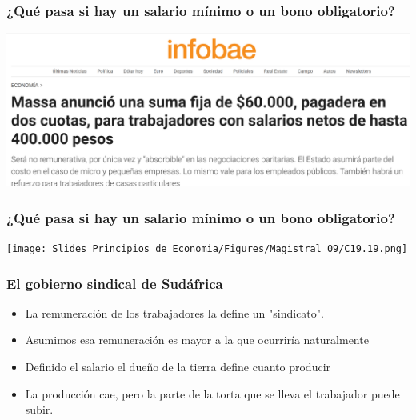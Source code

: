 \documentclass{beamer}
\begin{document}
\begin{frame}
\frametitle{¿Qué pasa si hay un salario mínimo o un bono obligatorio?}
\centering
\includegraphics[scale=0.33]{Slides Principios de Economia/Figures/InstitucionesBono.png}
\end{frame}

\begin{frame}
\frametitle{¿Qué pasa si hay un salario mínimo o un bono obligatorio?}
\centering
\texttt{[image: Slides Principios de Economia/Figures/Magistral\_09/C19.19.png]}
\end{frame}

\begin{frame}
\frametitle{El gobierno sindical de Sudáfrica}
\begin{itemize}
    \item La remuneración de los trabajadores la define un "sindicato". 
    \item  Asumimos esa remuneración es mayor a la que ocurriría naturalmente
    \item Definido el salario el dueño de la tierra define cuanto producir
    \item  La producción cae, pero la parte de la torta que se lleva el trabajador puede subir. 
\end{itemize}
\end{frame}
\end{document}
